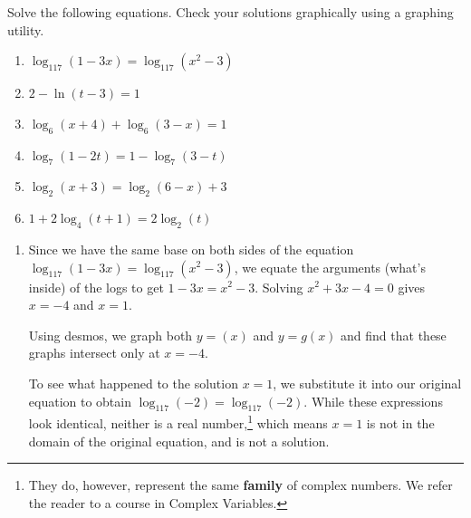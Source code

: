 \documentclass{ximera}
\begin{document}



\begin{example}  \label{LogEqnsEx1} Solve the following equations.  Check your solutions graphically using a graphing utility.

\begin{enumerate}

\item  $\log_{117}(1-3x) = \log_{117}\left(x^2-3\right)$

\item  $2 - \ln(t-3) = 1$

\item  $\log_{6}(x+4) + \log_{6}(3-x) = 1$

\item  $\log_{7}(1-2t) = 1 - \log_{7}(3-t)$

\item  $\log_{2}(x+3) = \log_{2}(6-x)+3$

\item  $1 + 2 \log_{4}(t+1) = 2 \log_{2}(t)$

\end{enumerate}

\begin{explanation}

\begin{enumerate}

\item  Since we have the same base on both sides of the equation $\log_{117}(1-3x) = \log_{117}\left(x^2-3\right)$, we equate the arguments (what's inside) of the logs to get $1-3x = x^2-3$.  Solving $x^2+3x-4 = 0$ gives $x=-4$ and $x=1$.  

Using desmos, we graph both $y = (x)$ and $y = g(x)$ and find that these graphs intersect only at $x=-4$.


\begin{center}
\end{center}

To see what happened to the solution $x=1$, we substitute it into our original equation to obtain  $\log_{117}(-2) =  \log_{117}(-2)$.  While these expressions look identical, neither is a real number,\footnote{They do, however, represent the same \textbf{family} of complex numbers.  We refer the reader to a course in Complex Variables.} which means $x=1$ is not in the domain of the original equation, and is not a solution.  



\end{enumerate}
\end{explanation}
\end{example}
\end{document}

